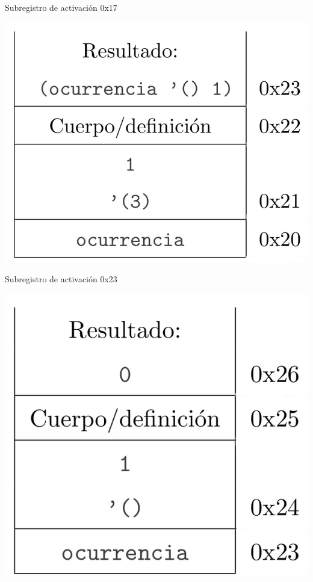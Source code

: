 \begin{multicols}{2}
Subregistro de activación 0x17
\begin{center}
        \includegraphics[scale=0.25]{./R4}
\end{center}

Subregistro de activación 0x23
\begin{center}
        \includegraphics[scale=0.25]{./R5}
\end{center}
\end{multicols}

